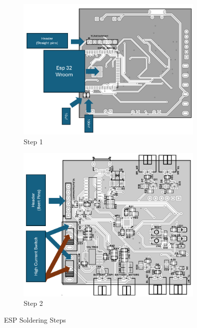\begin{figure}[H]
    \centering
    \begin{subfigure}[b]{0.63\textwidth}
        \centering
        \includegraphics[width=\textwidth]{img/assembly-1.png}
        \caption{Step 1}
    \end{subfigure}
    \hfill
    \begin{subfigure}[b]{0.6\textwidth}
        \centering
        \includegraphics[width=\textwidth]{img/assembly-2.png}
        \caption{Step 2}
    \end{subfigure}
    \caption{ESP Soldering Steps}
\end{figure}

